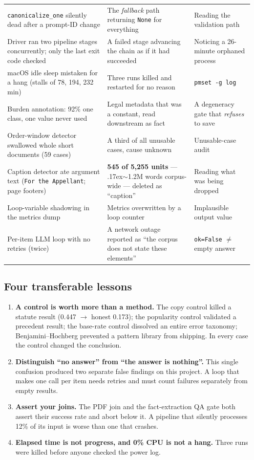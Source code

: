 \documentclass[12pt,a4paper]{article}
\newcommand{\code}[1]{\texttt{\small #1}}
\begin{document}
{\begin{longtable}{@{}p{4.6cm}p{5.2cm}p{4.4cm}@{}}
\code{canonicalize\_one} silently dead after a prompt-ID change
 & The \emph{fallback} path returning \code{None} for everything
 & Reading the validation path \\
\addlinespace
Driver ran two pipeline stages concurrently; only the last exit code checked
 & A failed stage advancing the chain as if it had succeeded
 & Noticing a 26-minute orphaned process \\
\addlinespace
macOS idle sleep mistaken for a hang (stalls of 78, 194, 232 min)
 & Three runs killed and restarted for no reason
 & \code{pmset -g log} \\
\addlinespace
Burden annotation: 92\% one class, one value never used
 & Legal metadata that was a constant, read downstream as fact
 & A degeneracy gate that \emph{refuses} to save \\
\addlinespace
Order-window detector swallowed whole short documents (59 cases)
 & A third of all unusable cases, cause unknown
 & Unusable-case audit \\
\addlinespace
Caption detector ate argument text (\code{For the Appellant}; page footers)
 & \textbf{545 of 5,255 units} --- {\raise.17ex\hbox{$\scriptstyle\sim$}}1.2M words corpus-wide --- deleted as ``caption''
 & Reading what was being dropped \\
\addlinespace
Loop-variable shadowing in the metrics dump
 & Metrics overwritten by a loop counter
 & Implausible output value \\
\addlinespace
Per-item LLM loop with no retries (twice)
 & A network outage reported as ``the corpus does not state these elements''
 & \code{ok=False} $\neq$ empty answer \\
\bottomrule
\end{longtable}
}

\subsection{Four transferable lessons}

\begin{enumerate}
\item \textbf{A control is worth more than a method.} The copy control killed a statute result
(0.447 $\rightarrow$ honest 0.173); the popularity control validated a precedent result; the
base-rate control dissolved an entire error taxonomy; Benjamini--Hochberg prevented a pattern library
from shipping. In every case the control changed the conclusion.
\item \textbf{Distinguish ``no answer'' from ``the answer is nothing''.} This single confusion
produced two separate false findings on this project. A loop that makes one call per item needs
retries and must count failures separately from empty results.
\item \textbf{Assert your joins.} The PDF join and the fact-extraction QA gate both assert their
success rate and abort below it. A pipeline that silently processes 12\% of its input is worse than
one that crashes.
\item \textbf{Elapsed time is not progress, and 0\% CPU is not a hang.} Three runs were killed
before anyone checked the power log.
\end{enumerate}
\end{document}
